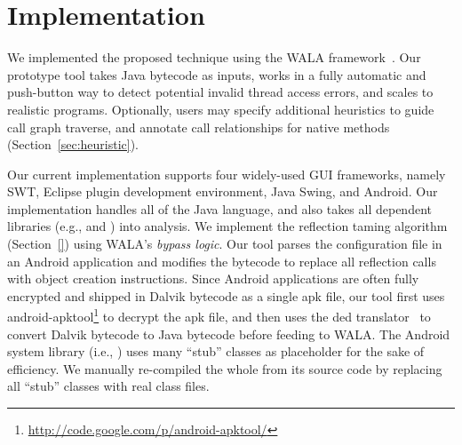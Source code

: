 \section{Implementation}
\label{sec:implementation}

We implemented the proposed technique using the WALA framework~\cite{walatutorial}.
Our prototype tool takes Java bytecode as inputs, works in a fully
automatic and push-button way to detect potential invalid thread access
errors, and scales to realistic programs.  
Optionally, users may specify additional heuristics to guide call graph
traverse, and annotate call relationships for native methods (Section~\ref{sec:heuristic}).

Our current implementation supports four widely-used GUI frameworks, namely
SWT, Eclipse plugin development environment, Java Swing, and Android.
Our implementation handles all of the Java language, and also takes
all dependent libraries (e.g.,  and )
into analysis. We implement the reflection taming algorithm (Section~\ref{})
using WALA's \textit{bypass logic}. Our tool parses the configuration file
in an Android application and modifies the bytecode to replace all
reflection calls with object creation instructions.
Since Android applications are often fully encrypted and shipped in Dalvik
bytecode as a single apk file, our tool first uses
android-apktool\footnote{\url{http://code.google.com/p/android-apktool/}} to
decrypt the apk file, and then uses the 
ded translator~\cite{Enck:2011:SAA:2028067.2028088} to convert
Dalvik bytecode to Java bytecode before feeding to WALA.  The Android system
library (i.e., ) uses many ``stub'' classes as
placeholder for the sake of efficiency. We manually re-compiled the whole
 from its source code by replacing all ``stub'' classes
with real class files.


